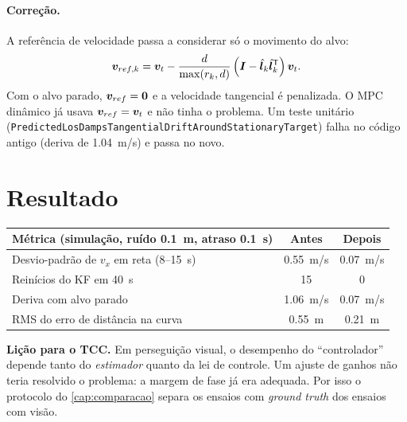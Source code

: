 \paragraph{Correção.} A referência de velocidade passa a considerar só o movimento do
alvo:
\begin{equation}
  \bm{v}_{ref,k} = \bm{v}_t - \frac{d}{\max(r_k,d)}\left(\bm{I}-\hat{\bm{l}}_k\hat{\bm{l}}_k^{\mathsf{T}}\right)\bm{v}_t .
\end{equation}
Com o alvo parado, $\bm{v}_{ref}=\bm{0}$ e a velocidade tangencial é penalizada. O
MPC dinâmico já usava $\bm{v}_{ref}=\bm{v}_t$ e não tinha o problema. Um teste
unitário (\nolinkurl{PredictedLosDampsTangentialDriftAroundStationaryTarget}) falha no
código antigo (deriva de \SI{1,04}{m/s}) e passa no novo.

\section{Resultado}
\begin{table}[H]
\centering
\begin{tabular}{@{}lcc@{}}
\toprule
Métrica (simulação, ruído \SI{0,1}{m}, atraso \SI{0,1}{s}) & Antes & Depois \\
\midrule
Desvio-padrão de $v_x$ em reta (8--\SI{15}{s}) & \SI{0,55}{m/s} & \SI{0,07}{m/s} \\
Reinícios do KF em \SI{40}{s} & 15 & 0 \\
Deriva com alvo parado & \SI{1,06}{m/s} & \SI{0,07}{m/s} \\
RMS do erro de distância na curva & \SI{0,55}{m} & \SI{0,21}{m} \\
\bottomrule
\end{tabular}
\end{table}

\begin{dica}
\textbf{Lição para o TCC.} Em perseguição visual, o desempenho do ``controlador'' depende
tanto do \emph{estimador} quanto da lei de controle. Um ajuste de ganhos não teria
resolvido o problema: a margem de fase já era adequada. Por isso o protocolo do
\cref{cap:comparacao} separa os ensaios com \emph{ground truth} dos ensaios com visão.
\end{dica}
